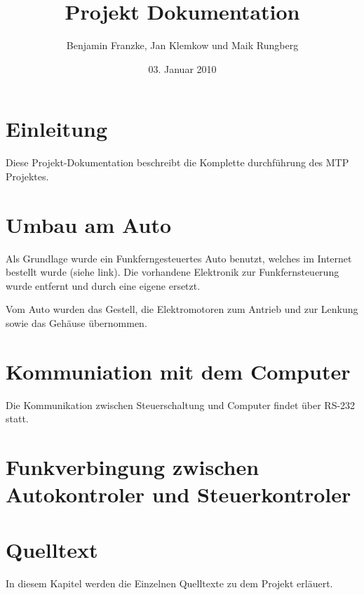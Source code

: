 \documentclass{scrartcl}
\title{Projekt Dokumentation}
\author{Benjamin Franzke, Jan Klemkow und Maik Rungberg}
\date{03. Januar 2010}
\begin{document}
\maketitle
\tableofcontents

\section{Einleitung} %
	Diese Projekt-Dokumentation beschreibt die Komplette durchführung des MTP Projektes.

\section{Umbau am Auto} %
	Als Grundlage wurde ein Funkferngesteuertes Auto benutzt,
	welches im Internet bestellt wurde (siehe link). %
	Die vorhandene Elektronik zur Funkfernsteuerung wurde entfernt und durch eine eigene ersetzt.

	Vom Auto wurden das Gestell, die Elektromotoren zum Antrieb und zur Lenkung sowie das Gehäuse übernommen.

\section{Kommuniation mit dem Computer} %
	Die Kommunikation zwischen Steuerschaltung und Computer findet über RS-232 statt.

\section{Funkverbingung zwischen Autokontroler und Steuerkontroler} %

\section{Quelltext} %
	In diesem Kapitel werden die Einzelnen Quelltexte zu dem Projekt erläuert.
\end{document}
